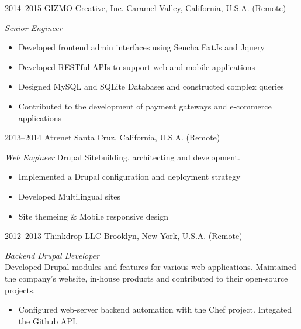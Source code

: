 \documentclass[]{friggeri-cv} %
\begin{document}
\begin{entrylist}
\entry
{2014--2015}
{GIZMO Creative, Inc.}
{Caramel Valley, California, U.S.A. (Remote)}
{\emph{Senior Engineer}
\begin{itemize}
\item Developed frontend admin interfaces using Sencha ExtJs and Jquery
\item Developed RESTful APIs to support web and mobile applications
\item Designed MySQL and SQLite Databases and constructed complex queries
\item Contributed to the development of payment gateways and e-commerce applications
\end{itemize}}
\entry
{2013--2014}
{Atrenet}
{Santa Cruz, California, U.S.A. (Remote)}
{\emph{Web Engineer}
Drupal Sitebuilding, architecting and development.
\begin{itemize}
\item Implemented a Drupal configuration and deployment strategy
\item Developed Multilingual sites
\item Site themeing \& Mobile responsive design
\end{itemize}}
\entry
{2012--2013}
{Thinkdrop LLC}
{Brooklyn, New York, U.S.A. (Remote)}
{ \emph{Backend Drupal Developer } \\
Developed Drupal modules and features for various web applications. Maintained the company's website, in-house products and contributed to their open-source projects.
\begin{itemize}
\item Configured web-server backend automation with the Chef project. Integated the Github API.

\end{itemize}}
\end{entrylist}
\end{document}
